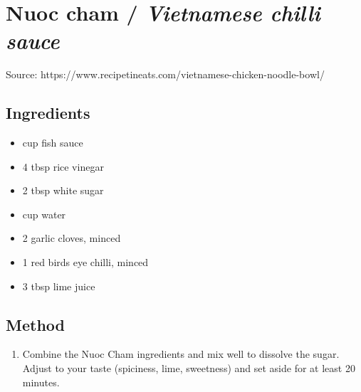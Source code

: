 \section{Nuoc cham / \emph{Vietnamese chilli sauce}}


Source: https://www.recipetineats.com/vietnamese-chicken-noodle-bowl/

\subsection{Ingredients}

\begin{itemize}
    \item {} cup fish sauce
    \item 4 tbsp rice vinegar
    \item 2 tbsp white sugar
    \item {} cup water
    \item 2 garlic cloves, minced
    \item 1 red birds eye chilli, minced
    \item 3 tbsp lime juice
\end{itemize}

\subsection{Method}

\begin{enumerate}
    \item Combine the Nuoc Cham ingredients and mix well to dissolve the sugar. Adjust to your taste (spiciness, lime, sweetness) and set aside for at least 20 minutes.
\end{enumerate}
